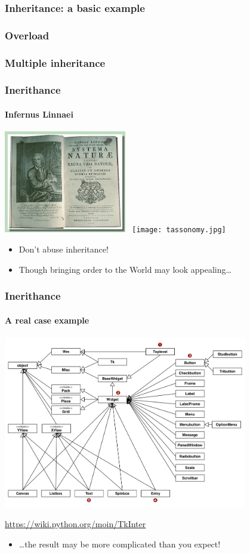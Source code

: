 \documentclass[9pt]{beamer}
\begin{document}
\begin{frame}
  \frametitle{Inheritance: a basic example}
  
\end{frame}


\begin{frame}
  \frametitle{Overload}
  
\end{frame}


\begin{frame}
  \frametitle{Multiple inheritance}
  
\end{frame}


\begin{frame}
  \frametitle{Inerithance}
  \framesubtitle{Infernus Linnaei}
  
  \centering
  \includegraphics[width=0.40\textwidth]{linneo.jpg}~\quad%
  \texttt{[image: tassonomy.jpg]}
  
  \bigskip
    
  \begin{itemize}
    \item Don't abuse inheritance!
    \medskip
    \item Though bringing order to the World may look appealing\dots
  \end{itemize}
  
\end{frame}


\begin{frame}
  \frametitle{Inerithance}
  \framesubtitle{A real case example}
  
  \centering
  \includegraphics[width=0.8\textwidth]{tk-widgets.png}
   
  \tiny \url{https://wiki.python.org/moin/TkInter} \normalsize
    
  \smallskip
  \begin{itemize}
    \item {\dots}the result may be more complicated than you expect!
  \end{itemize}
\end{frame}
\end{document}
